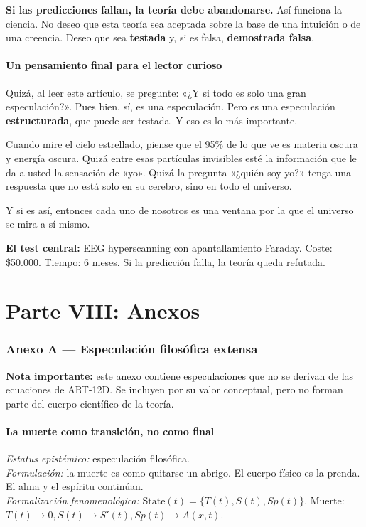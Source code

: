 \textbf{Si las predicciones fallan, la teoría debe abandonarse.} Así funciona la ciencia. No deseo que esta teoría sea aceptada sobre la base de una intuición o de una creencia. Deseo que sea \textbf{testada} y, si es falsa, \textbf{demostrada falsa}.

\subsection{Un pensamiento final para el lector curioso}
Quizá, al leer este artículo, se pregunte: «¿Y si todo es solo una gran especulación?». Pues bien, sí, es una especulación. Pero es una especulación \textbf{estructurada}, que puede ser testada. Y eso es lo más importante.

Cuando mire el cielo estrellado, piense que el 95\% de lo que ve es materia oscura y energía oscura. Quizá entre esas partículas invisibles esté la información que le da a usted la sensación de «yo». Quizá la pregunta «¿quién soy yo?» tenga una respuesta que no está solo en su cerebro, sino en todo el universo.

Y si es así, entonces cada uno de nosotros es una ventana por la que el universo se mira a sí mismo.

\textbf{El test central:} EEG hyperscanning con apantallamiento Faraday. Coste: \$50.000. Tiempo: 6 meses. Si la predicción falla, la teoría queda refutada.

\newpage
\part*{Parte VIII: Anexos}

\section{Anexo A --- Especulación filosófica extensa}
\textbf{Nota importante:} este anexo contiene especulaciones que no se derivan de las ecuaciones de ART-12D. Se incluyen por su valor conceptual, pero no forman parte del cuerpo científico de la teoría.

\subsection{La muerte como transición, no como final}
\textit{Estatus epistémico:} especulación filosófica. \\
\textit{Formulación:} la muerte es como quitarse un abrigo. El cuerpo físico es la prenda. El alma y el espíritu continúan. \\
\textit{Formalización fenomenológica:} $\text{State}(t) = \{ T(t), S(t), Sp(t) \}$. Muerte: $T(t) \to 0, S(t) \to S'(t), Sp(t) \to A(x,t)$.

